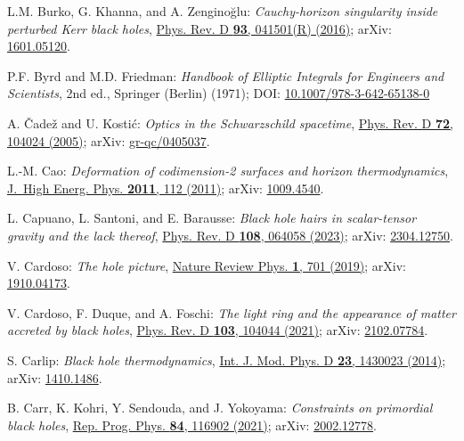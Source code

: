\begin{thebibliography}{123}
L.M. Burko, G. Khanna, and A. Zenginoğlu: {\em
Cauchy-horizon singularity inside perturbed Kerr black holes},
\href{https://doi.org/10.1103/PhysRevD.93.041501}{Phys. Rev. D {\bf 93}, 041501(R) (2016)};
arXiv: \href{https://arxiv.org/abs/1601.05120}{1601.05120}.

P.F. Byrd and M.D. Friedman:
{\em Handbook of Elliptic Integrals for Engineers and Scientists},
2nd ed., Springer (Berlin) (1971);
DOI: \href{https://doi.org/10.1007/978-3-642-65138-0}{10.1007/978-3-642-65138-0}

A. \v{C}ade\v{z} and U. Kosti\'c:
{\em Optics in the Schwarzschild spacetime},
\href{https://doi.org/10.1103/PhysRevD.72.104024}{Phys. Rev. D {\bf 72}, 104024 (2005)};
arXiv: \href{https://arxiv.org/abs/gr-qc/0405037}{gr-qc/0405037}.

L.-M. Cao:
{\em Deformation of codimension-2 surfaces and horizon thermodynamics},
\href{https://doi.org/10.1007/JHEP03(2011)112}{J.~High Energ. Phys. {\bf 2011}, 112 (2011)};
arXiv: \href{https://arxiv.org/abs/1009.4540}{1009.4540}.

L. Capuano, L. Santoni, and E. Barausse:
{\em Black hole hairs in scalar-tensor gravity and the lack thereof},
\href{https://doi.org/10.1103/PhysRevD.108.064058}{Phys. Rev. D {\bf 108}, 064058 (2023)};
arXiv: \href{https://arxiv.org/abs/2304.12750}{2304.12750}.

V. Cardoso:
{\em The hole picture},
\href{https://doi.org/10.1038/s42254-019-0119-2}{Nature Review Phys. {\bf 1}, 701 (2019)};
arXiv: \href{https://arxiv.org/abs/1910.04173}{1910.04173}.

V. Cardoso, F. Duque, and A. Foschi:
{\em The light ring and the appearance of matter accreted by black holes},
\href{https://doi.org/10.1103/PhysRevD.103.104044}{Phys. Rev. D {\bf 103}, 104044 (2021)};
arXiv: \href{https://arxiv.org/abs/2102.07784}{2102.07784}.

S. Carlip:
{\em Black hole thermodynamics},
\href{https://doi.org/10.1142/S0218271814300237}{Int. J. Mod. Phys. D {\bf 23}, 1430023 (2014)};
arXiv: \href{https://arxiv.org/abs/1410.1486}{1410.1486}.

B. Carr, K. Kohri, Y. Sendouda, and J. Yokoyama:
{\em Constraints on primordial black holes},
\href{https://doi.org/10.1088/1361-6633/ac1e31}{Rep. Prog. Phys. {\bf 84}, 116902 (2021)};
arXiv: \href{https://arxiv.org/abs/2002.12778}{2002.12778}.


\end{thebibliography}
